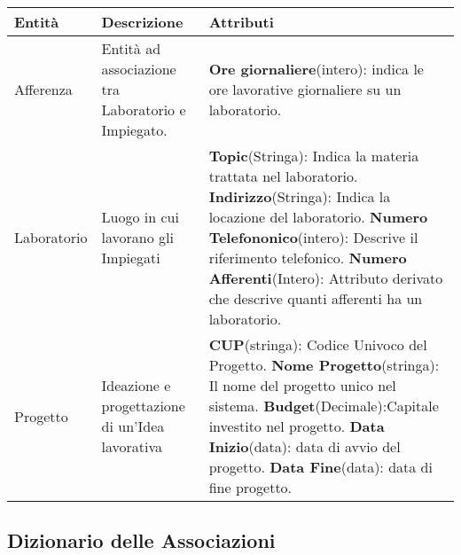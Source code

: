 \newpage
\begin{table}[h!]
    \centering
    \begin{tabular}{|p{}|p{}|p{}|}
        \hline
        
        \textbf{Entità} & \textbf{Descrizione} & \textbf{Attributi} \\ \hline

        Afferenza & Entità ad associazione tra Laboratorio e Impiegato.& 
        \textbf{Ore giornaliere}(intero): indica le ore lavorative giornaliere su un laboratorio.\newline
        \\ \hline

        Laboratorio & Luogo in cui lavorano gli Impiegati & 
        \textbf{Topic}(Stringa): Indica la materia trattata nel laboratorio.\newline
        \textbf{Indirizzo}(Stringa): Indica la locazione del laboratorio.\newline
        \textbf{Numero Telefononico}(intero): Descrive il riferimento telefonico.\newline
        \textbf{Numero Afferenti}(Intero): Attributo derivato che descrive quanti afferenti ha un laboratorio.
        \\ \hline

        Progetto & Ideazione e progettazione di un'Idea lavorativa & 
        \textbf{CUP}(stringa): Codice Univoco del Progetto. \newline
        \textbf{Nome Progetto}(stringa): Il nome del progetto unico nel sistema.\newline
        \textbf{Budget}(Decimale):Capitale investito nel progetto.\newline
        \textbf{Data Inizio}(data): data di avvio del progetto.\newline
        \textbf{Data Fine}(data): data di fine progetto.\newline
        \\ \hline
    \end{tabular}
\end{table}
\subsection{Dizionario delle Associazioni}

